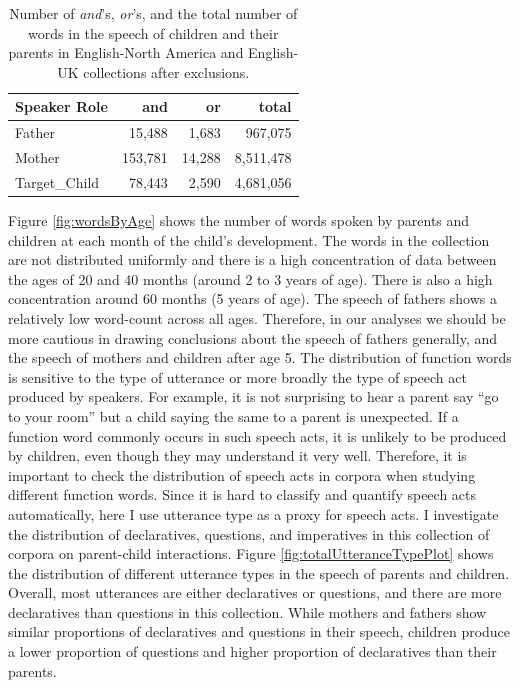 \documentclass[,man,floatsintext]{apa6}
\begin{document}
\begin{table}

\caption{\label{tab:countTable}Number of \textit{and}'s, \textit{or}'s, and the total number of words in the speech of children and their parents in English-North America and English-UK collections after exclusions.}
\centering
\begin{tabular}[t]{l|r|r|r}
\hline
Speaker Role & and & or & total\\
\hline
Father & 15,488 & 1,683 & 967,075\\
\hline
Mother & 153,781 & 14,288 & 8,511,478\\
\hline
Target\_Child & 78,443 & 2,590 & 4,681,056\\
\hline
\end{tabular}
\end{table}

Figure \ref{fig:wordsByAge} shows the number of words spoken by parents and children at each month of the child's development. The words in the collection are not distributed uniformly and there is a high concentration of data between the ages of 20 and 40 months (around 2 to 3 years of age). There is also a high concentration around 60 months (5 years of age). The speech of fathers shows a relatively low word-count across all ages. Therefore, in our analyses we should be more cautious in drawing conclusions about the speech of fathers generally, and the speech of mothers and children after age 5.
The distribution of function words is sensitive to the type of utterance or more broadly the type of speech act produced by speakers. For example, it is not surprising to hear a parent say \enquote{go to your room} but a child saying the same to a parent is unexpected. If a function word commonly occurs in such speech acts, it is unlikely to be produced by children, even though they may understand it very well. Therefore, it is important to check the distribution of speech acts in corpora when studying different function words. Since it is hard to classify and quantify speech acts automatically, here I use utterance type as a proxy for speech acts. I investigate the distribution of declaratives, questions, and imperatives in this collection of corpora on parent-child interactions. Figure \ref{fig:totalUtteranceTypePlot} shows the distribution of different utterance types in the speech of parents and children. Overall, most utterances are either declaratives or questions, and there are more declaratives than questions in this collection. While mothers and fathers show similar proportions of declaratives and questions in their speech, children produce a lower proportion of questions and higher proportion of declaratives than their parents.
\end{document}
